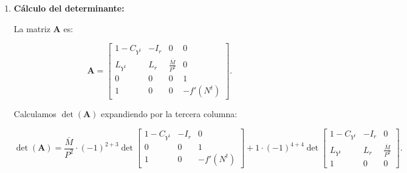 \documentclass[
  doc,
  floatsintext,
  longtable,
  a4paper,
  nolmodern,
  notxfonts,
  notimes,
  12pt,
  colorlinks=true,linkcolor=blue,citecolor=blue,urlcolor=blue]{apa7}
\begin{document}
\begin{enumerate}
  Escribimos el sistema en forma matricial
  \(\mathbf{A} \mathbf{x} = \mathbf{B} \mathbf{z}\):

  \[
  \begin{bmatrix}
  1 - C_{Y^t} & -I_r & 0 & 0 \\
  L_{Y^t} & L_r & \frac{\bar{M}}{P^2} & 0 \\
  0 & 0 & 0 & 1 \\
  1 & 0 & 0 & -f'(N^t)
  \end{bmatrix}
  \begin{bmatrix}
  dY^t \\
  dr \\
  dP \\
  dN^t
  \end{bmatrix}
  =
  \begin{bmatrix}
  1 & I_r & 0 & 0 \\
  0 & 0 & \frac{1}{P} & 0 \\
  0 & 0 & 0 & N^d_X \\
  0 & 0 & 0 & 0
  \end{bmatrix}
  \begin{bmatrix}
  d\bar{\mathrm{SD}} \\
  d\bar{\pi} \\
  d\bar{M} \\
  dX
  \end{bmatrix}.
  \]
\item
  \textbf{Cálculo del determinante:}

  La matriz \(\mathbf{A}\) es:

  \[
  \mathbf{A} = \begin{bmatrix}
  1 - C_{Y^t} & -I_r & 0 & 0 \\
  L_{Y^t} & L_r & \frac{\bar{M}}{P^2} & 0 \\
  0 & 0 & 0 & 1 \\
  1 & 0 & 0 & -f'(N^t)
  \end{bmatrix}.
  \]

  Calculamos \(\det(\mathbf{A})\) expandiendo por la tercera columna:

  \[
  \det(\mathbf{A}) = \frac{\bar{M}}{P^2} \cdot (-1)^{2+3} \det \begin{bmatrix}
  1 - C_{Y^t} & -I_r & 0 \\
  0 & 0 & 1 \\
  1 & 0 & -f'(N^t)
  \end{bmatrix} + 1 \cdot (-1)^{4+4} \det \begin{bmatrix}
  1 - C_{Y^t} & -I_r & 0 \\
  L_{Y^t} & L_r & \frac{\bar{M}}{P^2} \\
  1 & 0 & 0
  \end{bmatrix}.
  \]


\end{enumerate}
\end{document}
